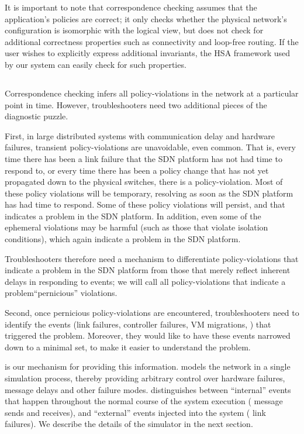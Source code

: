 It is important to note that correspondence checking assumes that the
application's policies are correct; it only checks whether the physical
network's configuration is isomorphic with the logical view, but does not
check for additional correctness properties such as connectivity and
loop-free routing. If the user wishes to explicitly express additional
invariants, the HSA framework used by our system can
easily check for such properties.

\subsection{\SIMULATOR{}}

Correspondence checking infers all policy-violations in the network at a
particular point in time. However, troubleshooters
need two additional pieces of the diagnostic puzzle. 

First, in large distributed
systems with communication delay and hardware failures, transient policy-violations
are unavoidable, even common. That is, every time there has been a link failure that the SDN platform has not had time to respond to, or every time there has been a policy change that has not yet propagated down to the physical switches, there is a policy-violation.  Most of these policy violations will be temporary, resolving as soon as the SDN platform has had time to respond.  Some of these policy violations will persist, and that indicates a problem in the SDN platform.  In addition, even some of the ephemeral violations may be harmful (such as those that violate isolation conditions), which again indicate a problem in the SDN platform.

Troubleshooters therefore need a mechanism to differentiate
policy-violations that indicate a problem in the SDN platform from those that merely reflect inherent delays in responding to events; we will call all policy-violations that indicate a problem``pernicious'' violations.

Second, once pernicious policy-violations are encountered, troubleshooters need to
identify the events (link failures, controller failures, VM migrations,
\etc{}) that triggered the problem. Moreover, they would like to have these events narrowed down to a minimal set, to make it easier to understand the problem.

\Simulator{} is our mechanism for providing this information. \Simulator{} models
the network in a single simulation process, thereby providing arbitrary control over hardware
failures, message delays and other failure modes. \Simulator{} distinguishes
between ``internal'' events that happen throughout the normal course of the
system execution (\eg{} message sends and receives), and ``external'' events
injected into the system (\eg{} link failures). We describe the details
of the simulator in the next section.


